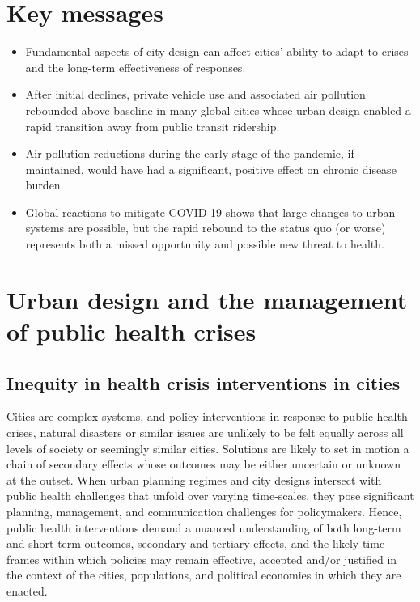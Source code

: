 \documentclass[preprint,10pt]{elsarticle} %
\begin{document}
\section*{Key messages}
\begin{itemize}
    \item[]  Fundamental aspects of city design can affect cities' ability to adapt to crises and the long-term effectiveness of responses.
    \item[] After initial declines, private vehicle use and associated air pollution rebounded above baseline in many global cities whose urban design enabled a rapid transition away from public transit ridership.
    \item[] Air pollution reductions during the early stage of the pandemic, if maintained, would have had a significant, positive effect on chronic disease burden. 
    \item[] Global reactions to mitigate COVID-19 shows that large changes to urban systems are possible, but the rapid rebound to the status quo (or worse) represents both a missed opportunity and possible new threat to health.
\end{itemize}

\section*{\textcolor{OliveGreen}{Urban design and the management of public health crises}}
\subsection*{Inequity in health crisis interventions in cities}

Cities are complex systems\cite{DiezRoux2015}, and policy interventions in response to public health crises, natural disasters or similar issues are unlikely to be felt equally across all levels of society or seemingly similar cities. Solutions are likely to set in motion a chain of secondary effects whose outcomes may be either uncertain or unknown at the outset\cite{Sterman2006}. When urban planning regimes and city designs intersect with public health challenges that unfold over varying time-scales\cite{casti2012x}, they pose significant planning, management, and communication challenges for policymakers\cite{thompson2022modelling,thompson2022framework}. Hence, public health interventions demand a nuanced understanding of both long-term and short-term outcomes, secondary and tertiary effects, and the likely time-frames within which policies may remain effective, accepted and/or justified in the context of the cities, populations, and political economies in which they are enacted\cite{dawson2016snakes, oliu2021sars}.
\end{document}
